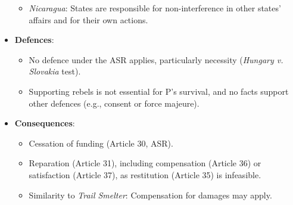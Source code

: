 \begin{itemize}
\begin{itemize}
        \item \textit{Nicaragua}: States are responsible for non-interference in other states’ affairs and for their own actions.
    \end{itemize}
    \item \textbf{Defences}:
    \begin{itemize}
        \item No defence under the ASR applies, particularly necessity (\textit{Hungary v. Slovakia} test).
        \item Supporting rebels is not essential for P’s survival, and no facts support other defences (e.g., consent or force majeure).
    \end{itemize}
    \item \textbf{Consequences}:
    \begin{itemize}
        \item Cessation of funding (Article 30, ASR).
        \item Reparation (Article 31), including compensation (Article 36) or satisfaction (Article 37), as restitution (Article 35) is infeasible.
        \item Similarity to \textit{Trail Smelter}: Compensation for damages may apply.
    \end{itemize}
\end{itemize}

